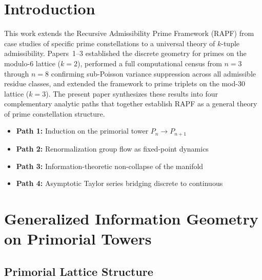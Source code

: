 \documentclass[11pt]{article}
\theoremstyle{remark}
\begin{document}
\section{Introduction}

This work extends the Recursive Admissibility Prime Framework (RAPF) from
case studies of specific prime constellations to a universal theory of
$k$-tuple admissibility. Papers~1--3 established the discrete geometry
for primes on the modulo-6 lattice ($k=2$), performed a full computational
census from $n=3$ through $n=8$ confirming sub-Poisson variance suppression
across all admissible residue classes, and extended the framework to prime
triplets on the mod-30 lattice ($k=3$). The present paper synthesizes
these results into four complementary analytic paths that together establish
RAPF as a general theory of prime constellation structure.

\begin{itemize}
    \item \textbf{Path 1:} Induction on the primorial tower $P_n \to P_{n+1}$
    \item \textbf{Path 2:} Renormalization group flow as fixed-point dynamics
    \item \textbf{Path 3:} Information-theoretic non-collapse of the manifold
    \item \textbf{Path 4:} Asymptotic Taylor series bridging discrete to continuous
\end{itemize}

\section{Generalized Information Geometry on Primorial Towers}

\subsection{Primorial Lattice Structure}
\end{document}
